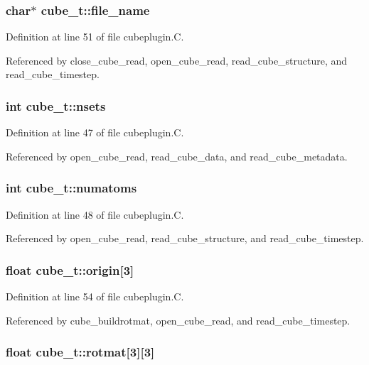 \subsubsection{\setlength{\rightskip}{0pt plus 5cm}char$\ast$ cube\_\-t::file\_\-name}\label{structcube__t_m6}




Definition at line 51 of file cubeplugin.C.

Referenced by close\_\-cube\_\-read, open\_\-cube\_\-read, read\_\-cube\_\-structure, and read\_\-cube\_\-timestep.
\subsubsection{\setlength{\rightskip}{0pt plus 5cm}int cube\_\-t::nsets}\label{structcube__t_m1}




Definition at line 47 of file cubeplugin.C.

Referenced by open\_\-cube\_\-read, read\_\-cube\_\-data, and read\_\-cube\_\-metadata.
\subsubsection{\setlength{\rightskip}{0pt plus 5cm}int cube\_\-t::numatoms}\label{structcube__t_m2}




Definition at line 48 of file cubeplugin.C.

Referenced by open\_\-cube\_\-read, read\_\-cube\_\-structure, and read\_\-cube\_\-timestep.
\subsubsection{\setlength{\rightskip}{0pt plus 5cm}float cube\_\-t::origin[3]}\label{structcube__t_m9}




Definition at line 54 of file cubeplugin.C.

Referenced by cube\_\-buildrotmat, open\_\-cube\_\-read, and read\_\-cube\_\-timestep.
\subsubsection{\setlength{\rightskip}{0pt plus 5cm}float cube\_\-t::rotmat[3][3]}\label{structcube__t_m10}




